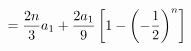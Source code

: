 \documentclass[preview]{standalone}
\begin{document}
\begin{align*}
\special{dvisvgm:raw <g id='unique000'>}=\frac{2n}{3}a_1+\frac{2a_1}{9}\left[1-\left(-\frac{1}{2}\right)^n\right]\special{dvisvgm:raw </g>}
\end{align*}
\end{document}
